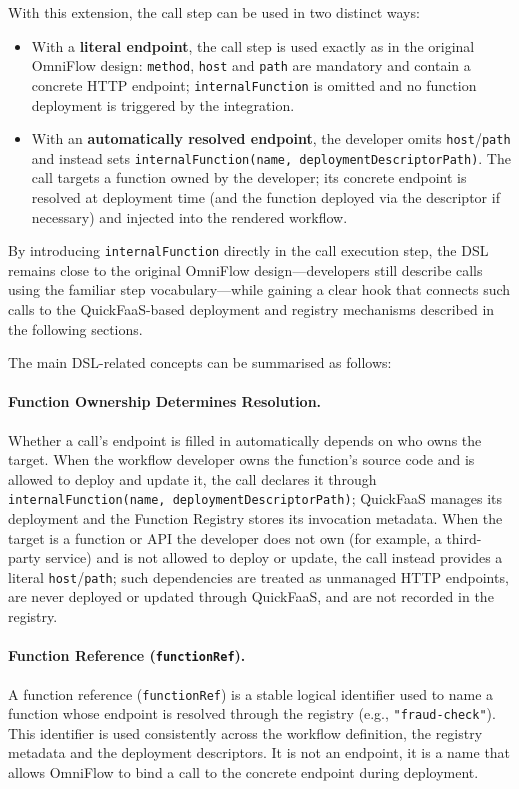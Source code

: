 With this extension, the call step can be used in two distinct ways:

\begin{itemize}
  \item With a \textbf{literal endpoint}, the call step is used exactly as in the original OmniFlow design: \texttt{method}, \texttt{host} and \texttt{path} are mandatory and contain a concrete HTTP endpoint; \texttt{internalFunction} is omitted and no function deployment is triggered by the integration.
  \item With an \textbf{automatically resolved endpoint}, the developer omits \texttt{host}/\texttt{path} and instead sets \texttt{internalFunction(name, deploymentDescriptorPath)}. The call targets a function owned by the developer; its concrete endpoint is resolved at deployment time (and the function deployed via the descriptor if necessary) and injected into the rendered workflow.
\end{itemize}

By introducing \texttt{internalFunction} directly in the call execution step, the DSL remains close to the original OmniFlow design—developers still describe calls using the familiar step vocabulary—while gaining a clear hook that connects such calls to the QuickFaaS-based deployment and registry mechanisms described in the following sections.

The main DSL-related concepts can be summarised as follows:

\paragraph{Function Ownership Determines Resolution.}
Whether a call's endpoint is filled in automatically depends on who owns the target. When the workflow developer owns the function's source code and is allowed to deploy and update it, the call declares it through \texttt{internalFunction(name, deploymentDescriptorPath)}; QuickFaaS manages its deployment and the Function Registry stores its invocation metadata. When the target is a function or API the developer does not own (for example, a third-party service) and is not allowed to deploy or update, the call instead provides a literal \texttt{host}/\texttt{path}; such dependencies are treated as unmanaged HTTP endpoints, are never deployed or updated through QuickFaaS, and are not recorded in the registry.

\paragraph{Function Reference (\texttt{functionRef}).}
A function reference (\texttt{functionRef}) is a stable logical identifier used to name a function whose endpoint is resolved through the registry (e.g., \texttt{"fraud-check"}). This identifier is used consistently across the workflow definition, the registry metadata and the deployment descriptors. It is not an endpoint, it is a name that allows OmniFlow to bind a call to the concrete endpoint during deployment.

